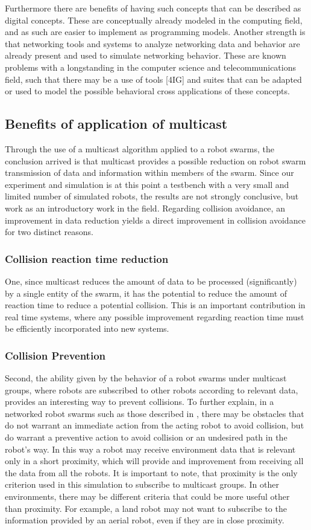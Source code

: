 \documentclass[journal]{IEEEtran}
\begin{document}
Furthermore there are benefits of having such concepts that can be described as digital concepts. These are conceptually already modeled in the computing field, and as such are easier to implement as programming models. 
Another strength is that networking tools and systems to analyze networking data and behavior are already present and used to simulate networking behavior. These are known problems with a longstanding in the computer science and telecommunications field, such that there may be a use of tools [4IG] and suites that can be adapted or used to model the possible behavioral cross applications of these concepts.


\subsection{Benefits of application of multicast}
Through the use of a multicast algorithm applied to a robot swarms, the conclusion arrived is that multicast provides a possible reduction on robot swarm transmission of data and information within members of the swarm. Since our experiment and simulation is at this point a testbench with a very small and limited number of simulated robots, the results are not strongly conclusive, but work as an introductory work in the field.  
Regarding collision avoidance, an improvement in data reduction yields a direct improvement in collision avoidance for two distinct reasons. 
\subsubsection{Collision reaction time reduction}
One, since multicast reduces the amount of data to be processed (significantly) by a single entity of the swarm, it has the potential to reduce the amount of reaction time to reduce a potential collision. This is an important contribution in real time systems, where any possible improvement regarding reaction time must be efficiently incorporated into new systems.
\subsubsection{Collision Prevention}
Second, the ability given by the behavior of a robot swarms under multicast groups, where robots are subscribed to other robots according to relevant data, provides an interesting way to prevent collisions. To further explain, in a networked robot swarms such as those described in \cite{IG5}, there may be obstacles that do not warrant an immediate action from the acting robot to avoid collision, but do warrant a preventive action to avoid collision or an undesired path in the robot’s way. In this way a robot may receive environment data that is relevant only in a short proximity, which will provide and improvement from receiving all the data from all the robots. It is important to note, that proximity is the only criterion used in this simulation to subscribe to multicast groups. In other environments, there may be different criteria that could be more useful other than proximity. For example, a land robot may not want to subscribe to the information provided by an aerial robot, even if they are in close proximity.
\end{document}
